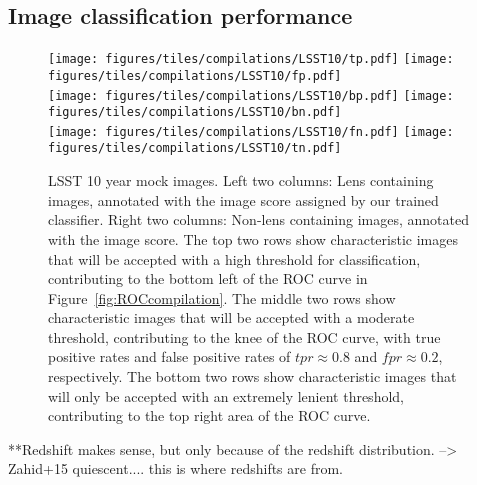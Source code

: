 \documentclass{emulateapj}
\begin{document}
\subsection{Image classification performance}\label{sec:performance}

\begin{figure*}[t]\label{fig:ROCsamplesLSST10}
\begin{center}
\texttt{[image: figures/tiles/compilations/LSST10/tp.pdf]}\hspace{5pt}
\texttt{[image: figures/tiles/compilations/LSST10/fp.pdf]}\\\vspace{5pt}
\texttt{[image: figures/tiles/compilations/LSST10/bp.pdf]}\hspace{5pt}
\texttt{[image: figures/tiles/compilations/LSST10/bn.pdf]}\\\vspace{5pt}
\texttt{[image: figures/tiles/compilations/LSST10/fn.pdf]}\hspace{5pt}
\texttt{[image: figures/tiles/compilations/LSST10/tn.pdf]}\\
\caption{LSST 10 year mock images. Left two columns: Lens containing
  images, annotated with the image score assigned by our trained
  classifier.  Right two columns: Non-lens containing images,
  annotated with the image score.  The top two rows show
  characteristic images that will be accepted with a high threshold
  for classification, contributing to the bottom left of the ROC curve
  in Figure~\ref{fig:ROCcompilation}.  The middle two rows show
  characteristic images that will be accepted with a moderate
  threshold, contributing to the knee of the ROC curve, with true
  positive rates and false positive rates of $tpr\approx0.8$ and
  $fpr\approx0.2$, respectively.  The bottom two rows show
  characteristic images that will only be accepted with an extremely
  lenient threshold, contributing to the top right area of the ROC
  curve.}
\end{center}
\end{figure*}




**Redshift makes sense, but only because of the redshift distribution.
--> Zahid+15 quiescent.... this is where redshifts are from.
\end{document}
